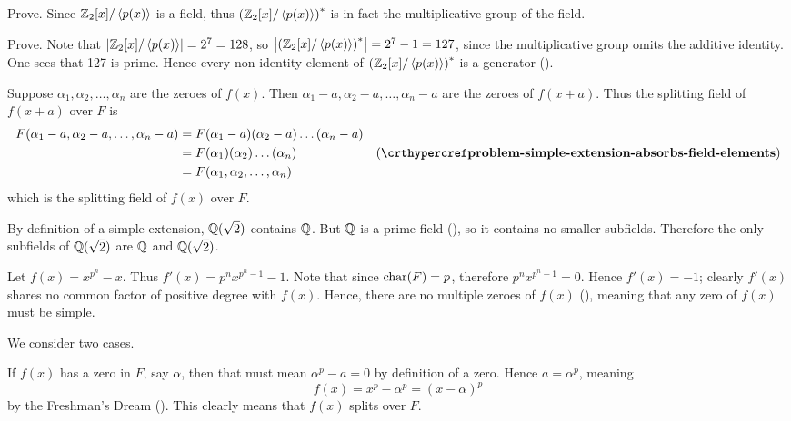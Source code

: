 \begin{questions}
\begin{partquestions}{\roman*}
        \item Prove. Since $\mathbb{Z}_2[x]/\left\langle p(x)\right\rangle$ is a field, thus $\left(\mathbb{Z}_2[x]/\left\langle p(x)\right\rangle\right)^\ast$ is in fact the multiplicative group of the field.

        \item Prove. Note that $\left|\mathbb{Z}_2[x]/\left\langle p(x)\right\rangle\right| = 2^7 = 128$, so $\left|\left(\mathbb{Z}_2[x]/\left\langle p(x)\right\rangle\right)^\ast\right| = 2^7 - 1 = 127$, since the multiplicative group omits the additive identity. One sees that 127 is prime. Hence every non-identity element of $\left(\mathbb{Z}_2[x]/\left\langle p(x)\right\rangle\right)^\ast$ is a generator ().
    \end{partquestions}

    \item Suppose $\alpha_1, \alpha_2, \dots, \alpha_n$ are the zeroes of $f(x)$. Then $\alpha_1 - a, \alpha_2 - a, \dots, \alpha_n - a$ are the zeroes of $f(x+a)$. Thus the splitting field of $f(x+a)$ over $F$ is
    \begin{align*}
        F(\alpha_1 - a, \alpha_2 - a, \dots, \alpha_n - a) &= F(\alpha_1 - a)(\alpha_2 - a)\dots(\alpha_n - a)\\
        &= F(\alpha_1)(\alpha_2)\dots(\alpha_n) & (\myref{problem-simple-extension-absorbs-field-elements})\\
        &= F(\alpha_1, \alpha_2, \dots, \alpha_n)
    \end{align*}
    which is the splitting field of $f(x)$ over $F$.

    \item By definition of a simple extension, $\mathbb{Q}(\sqrt2)$ contains $\mathbb{Q}$. But $\mathbb{Q}$ is a prime field (), so it contains no smaller subfields. Therefore the only subfields of $\mathbb{Q}(\sqrt2)$ are $\mathbb{Q}$ and $\mathbb{Q}(\sqrt2)$.

    \item Let $f(x) = x^{p^n} - x$. Thus $f'(x) = p^nx^{p^n-1}-1$. Note that since $\mathrm{char}(F) = p$, therefore $p^nx^{p^n-1} = 0$. Hence $f'(x) = -1$; clearly $f'(x)$ shares no common factor of positive degree with $f(x)$. Hence, there are no multiple zeroes of $f(x)$ (), meaning that any zero of $f(x)$ must be simple.

    \item We consider two cases.

    If $f(x)$ has a zero in $F$, say $\alpha$, then that must mean $\alpha^p - a = 0$ by definition of a zero. Hence $a = \alpha^p$, meaning
    \[
        f(x) = x^p - \alpha^p = (x-\alpha)^p
    \]
    by the Freshman's Dream (). This clearly means that $f(x)$ splits over $F$.


\end{questions}
